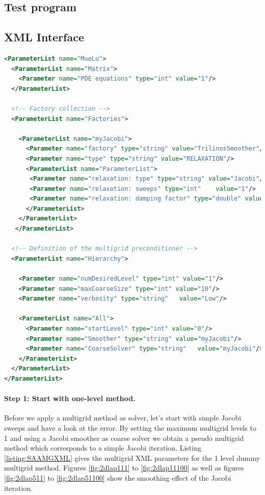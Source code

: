 \documentclass[12pt,a4paper]{article}
\newcommand{\MueLu}{MueLu}
\begin{document}
\subsection{Test program}

\subsection{XML Interface}

\begin{Listing} 
\begin{center} 
\begin{lstlisting}[language=XML,label=listing:SAAMGXML]
<ParameterList name="MueLu">
  <ParameterList name="Matrix">
    <Parameter name="PDE equations" type="int" value="1"/> 
  </ParameterList>

  <!-- Factory collection -->
  <ParameterList name="Factories">
     
    <ParameterList name="myJacobi">
      <Parameter name="factory" type="string" value="TrilinosSmoother"/>
      <Parameter name="type" type="string" value="RELAXATION"/>
      <ParameterList name="ParameterList">
       <Parameter name="relaxation: type" type="string" value="Jacobi"/>
       <Parameter name="relaxation: sweeps" type="int"    value="1"/>
       <Parameter name="relaxation: damping factor" type="double" value="0.9"/>
      </ParameterList>
    </ParameterList>
   </ParameterList>

  <!-- Definition of the multigrid preconditioner -->
  <ParameterList name="Hierarchy">

    <Parameter name="numDesiredLevel" type="int" value="1"/> 
    <Parameter name="maxCoarseSize" type="int" value="10"/>
    <Parameter name="verbosity" type="string"   value="Low"/>

    <ParameterList name="All">
      <Parameter name="startLevel" type="int" value="0"/>
      <Parameter name="Smoother" type="string" value="myJacobi"/>
      <Parameter name="CoarseSolver" type="string"   value="myJacobi"/>    
    </ParameterList>
  </ParameterList>
</ParameterList>
\end{lstlisting}
\caption{Structure of XML input file for \MueLu~ with smoothed aggregation transfer operators and Jacobi level smoothers.} 
\label{listing:SAAMGXML}
\end{center}
\end{Listing}

\paragraph{Step 1: Start with one-level method.}
Before we apply a multigrid method as solver, let's start with simple Jacobi sweeps and have a look at the error.
By setting the maximum multigrid levels to 1 and using a Jacobi smoother as coarse solver we obtain a pseudo multigrid method which corresponds to a simple Jacobi iteration. Listing \ref{listing:SAAMGXML} gives the multigrid XML parameters for the 1 level dummy multigrid method. Figures \ref{fig:2dlap111} to \ref{fig:2dlap11100} as well as figures \ref{fig:2dlap511} to \ref{fig:2dlap51100} show the smoothing effect of the Jacobi iteration.
\end{document}
